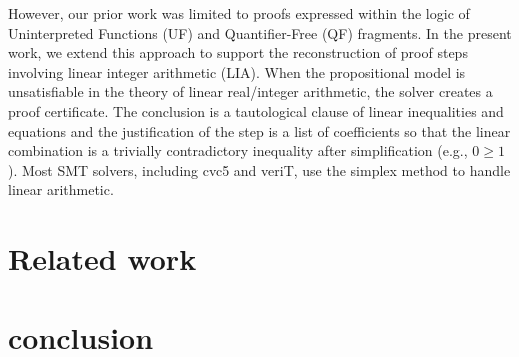 \documentclass[runningheads]{llncs}
\begin{document}
However, our prior work was limited to proofs expressed within the logic of Uninterpreted Functions (UF) and Quantifier-Free (QF) fragments. 
In the present work, we extend this approach to support the reconstruction of proof steps involving linear integer arithmetic (LIA).
When the propositional model is unsatisfiable in the theory of linear real/integer arithmetic, the solver creates a proof certificate.
The conclusion is a tautological clause of linear inequalities and equations and the justification of the step is a list of coefficients so that the linear combination is a trivially contradictory inequality after simplification (e.g., $0 \geq 1$).
Most SMT solvers, including cvc5 and veriT, use the simplex method \cite{SRI:simplex:dpllt} to handle linear arithmetic.











\section{Related work}

\section{conclusion}





\end{document}
